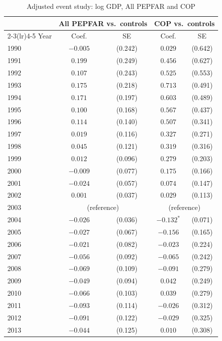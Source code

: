 \begin{table}[htbp]
\centering
\small
\caption{Adjusted event study: log GDP, All PEPFAR and COP}
\label{tab:crown_es_combined_log_gdp}
\begin{tabular}{lcccc}
\toprule
 & \multicolumn{2}{c}{All PEPFAR vs.\ controls} & \multicolumn{2}{c}{COP vs.\ controls} \\
\cmidrule(lr){2-3}\cmidrule(lr){4-5}
Year & Coef. & SE & Coef. & SE \\
\midrule
1990 & $-0.005$ & (0.242) & $0.029$ & (0.642) \\
1991 & $0.199$ & (0.249) & $0.456$ & (0.627) \\
1992 & $0.107$ & (0.243) & $0.525$ & (0.553) \\
1993 & $0.175$ & (0.218) & $0.713$ & (0.491) \\
1994 & $0.171$ & (0.197) & $0.603$ & (0.489) \\
1995 & $0.100$ & (0.168) & $0.567$ & (0.437) \\
1996 & $0.114$ & (0.140) & $0.507$ & (0.341) \\
1997 & $0.019$ & (0.116) & $0.327$ & (0.271) \\
1998 & $0.045$ & (0.121) & $0.319$ & (0.316) \\
1999 & $0.012$ & (0.096) & $0.279$ & (0.203) \\
2000 & $-0.009$ & (0.077) & $0.175$ & (0.166) \\
2001 & $-0.024$ & (0.057) & $0.074$ & (0.147) \\
2002 & $0.001$ & (0.037) & $0.029$ & (0.113) \\
2003 & \multicolumn{2}{c}{(reference)} & \multicolumn{2}{c}{(reference)} \\
2004 & $-0.026$ & (0.036) & $-0.132^{*}$ & (0.071) \\
2005 & $-0.027$ & (0.067) & $-0.156$ & (0.165) \\
2006 & $-0.021$ & (0.082) & $-0.023$ & (0.224) \\
2007 & $-0.056$ & (0.092) & $-0.065$ & (0.242) \\
2008 & $-0.069$ & (0.109) & $-0.091$ & (0.279) \\
2009 & $-0.049$ & (0.094) & $0.042$ & (0.249) \\
2010 & $-0.066$ & (0.103) & $0.039$ & (0.279) \\
2011 & $-0.093$ & (0.114) & $-0.026$ & (0.312) \\
2012 & $-0.091$ & (0.122) & $-0.029$ & (0.325) \\
2013 & $-0.044$ & (0.125) & $0.010$ & (0.308) \\

\end{tabular}
\end{table}
